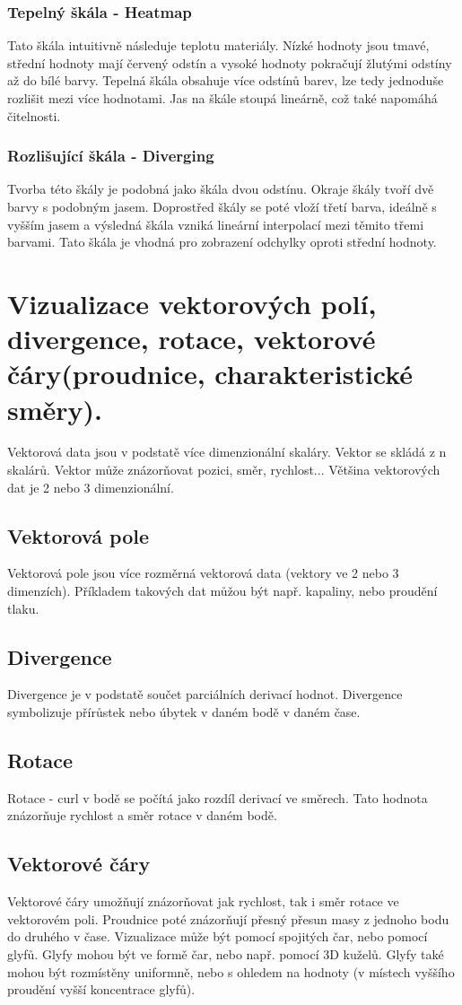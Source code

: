 \documentclass[10pt,a4paper, table]{article}
\begin{document}
\subsubsection{Tepelný škála - Heatmap}
Tato škála intuitivně následuje teplotu materiály. Nízké hodnoty jsou tmavé, střední hodnoty mají červený odstín a vysoké hodnoty pokračují žlutými odstíny až do bílé barvy. Tepelná škála obsahuje více odstínů barev, lze tedy jednoduše rozlišit mezi více hodnotami. Jas na škále stoupá lineárně, což také napomáhá čitelnosti.
\subsubsection{Rozlišující škála - Diverging}
Tvorba této škály je podobná jako škála dvou odstínu. Okraje škály tvoří dvě barvy s podobným jasem. Doprostřed škály se poté vloží třetí barva, ideálně s vyšším jasem a výsledná škála vzniká lineární interpolací mezi těmito třemi barvami. Tato škála je vhodná pro zobrazení odchylky oproti střední hodnoty.


\clearpage
\section{Vizualizace  vektorových  polí, divergence, rotace, vektorové čáry(proudnice, charakteristické směry).}
Vektorová data jsou v podstatě více dimenzionální skaláry. Vektor se skládá z n skalárů. Vektor může znázorňovat pozici, směr, rychlost... Většina vektorových dat je 2 nebo 3 dimenzionální.
\subsection{Vektorová pole}
Vektorová pole jsou více rozměrná vektorová data (vektory ve 2 nebo 3 dimenzích). Příkladem takových dat můžou být např. kapaliny, nebo proudění tlaku.
\subsection{Divergence}
Divergence je v podstatě součet parciálních derivací hodnot. Divergence symbolizuje přírůstek nebo úbytek v daném bodě v daném čase.
\subsection{Rotace}
Rotace - curl v bodě se počítá jako rozdíl derivací ve směrech. Tato hodnota znázorňuje rychlost a směr rotace v daném bodě.
\subsection{Vektorové čáry}
Vektorové čáry umožňují znázorňovat jak rychlost, tak i směr rotace ve vektorovém poli. Proudnice poté znázorňují přesný přesun masy z jednoho bodu do druhého v čase. Vizualizace může být pomocí spojitých čar, nebo pomocí glyfů. Glyfy mohou být ve formě čar, nebo např. pomocí 3D kuželů. Glyfy také mohou být rozmístěny uniformně, nebo s ohledem na hodnoty (v místech vyššího proudění vyšší koncentrace glyfů).
\end{document}
